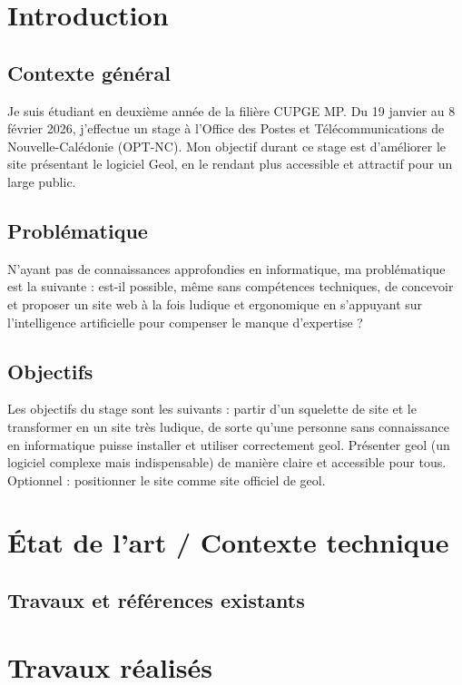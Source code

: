 \documentclass[12pt,a4paper]{report}
\begin{document}
\cleardoublepage
\tableofcontents
\cleardoublepage
\listoffigures
\listoftables

\cleardoublepage
\chapter{Introduction}
\section{Contexte général}
Je suis étudiant en deuxième année de la filière CUPGE MP. Du 19 janvier au 8 février 2026, j'effectue un stage à l'Office des Postes et Télécommunications de Nouvelle-Calédonie (OPT-NC). Mon objectif durant ce stage est d'améliorer le site présentant le logiciel Geol, en le rendant plus accessible et attractif pour un large public.

\section{Problématique}
N'ayant pas de connaissances approfondies en informatique, ma problématique est la suivante : est-il possible, même sans compétences techniques, de concevoir et proposer un site web à la fois ludique et ergonomique en s'appuyant sur l'intelligence artificielle pour compenser le manque d'expertise ?

\section{Objectifs}
Les objectifs du stage sont les suivants : partir d'un squelette de site et le transformer en un site très ludique, de sorte qu'une personne sans connaissance en informatique puisse installer et utiliser correctement geol. Présenter geol (un logiciel complexe mais indispensable) de manière claire et accessible pour tous. Optionnel : positionner le site comme site officiel de geol.

\chapter{État de l'art / Contexte technique}
\section{Travaux et références existants}

\chapter{Travaux réalisés}
\end{document}
